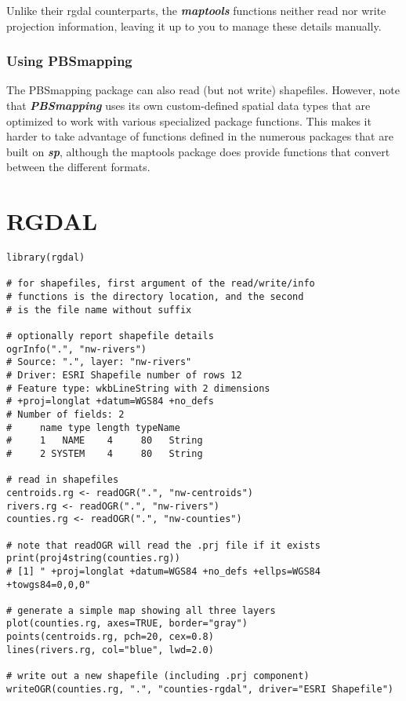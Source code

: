 \documentclass[12pt]{article}
\begin{document}
Unlike their rgdal counterparts, the \textbf{\textit{maptools}} functions neither read nor write projection information, leaving it up to you to manage these details manually.

\subsubsection{Using PBSmapping}
The PBSmapping package can also read (but not write) shapefiles. However, note that \textit{\textbf{PBSmapping}} uses its own custom-defined spatial data types that are optimized to work with various specialized package functions. This makes it harder to take advantage of functions defined in the numerous packages that are built on \textit{\textbf{sp}}, although the maptools package does provide functions that convert between the different formats.

\newpage
\section{RGDAL}
\begin{framed}
\begin{verbatim}
library(rgdal)
 
# for shapefiles, first argument of the read/write/info 
# functions is the directory location, and the second 
# is the file name without suffix
 
# optionally report shapefile details
ogrInfo(".", "nw-rivers")
# Source: ".", layer: "nw-rivers"
# Driver: ESRI Shapefile number of rows 12 
# Feature type: wkbLineString with 2 dimensions
# +proj=longlat +datum=WGS84 +no_defs  
# Number of fields: 2 
#     name type length typeName
#     1   NAME    4     80   String
#     2 SYSTEM    4     80   String
 
# read in shapefiles
centroids.rg <- readOGR(".", "nw-centroids")
rivers.rg <- readOGR(".", "nw-rivers")
counties.rg <- readOGR(".", "nw-counties")
 
# note that readOGR will read the .prj file if it exists
print(proj4string(counties.rg))
# [1] " +proj=longlat +datum=WGS84 +no_defs +ellps=WGS84 +towgs84=0,0,0"
 
# generate a simple map showing all three layers
plot(counties.rg, axes=TRUE, border="gray")
points(centroids.rg, pch=20, cex=0.8)
lines(rivers.rg, col="blue", lwd=2.0)
 
# write out a new shapefile (including .prj component)
writeOGR(counties.rg, ".", "counties-rgdal", driver="ESRI Shapefile")
\end{verbatim}
\end{framed}
\end{document}
